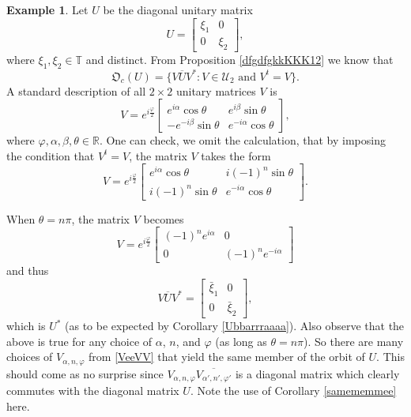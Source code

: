 \documentclass{dis}
\theoremstyle{plain}
\theoremstyle{definition}
\newtheorem{Example}[equation]{Example}
\def\R{\mathbb{R}}
\def\T{\mathbb{T}}
\newcommand{\0}{{\color{lightgray}0}}
\begin{document}
\begin{Example}\label{twobytwo}
 Let $U$ be  the diagonal unitary matrix 
$$U = \begin{bmatrix} \xi_1 & 0\\ 0 & \xi_2 \end{bmatrix},$$
where $\xi_1, \xi_2 \in \T$ and distinct.  From Proposition \ref{dfgdfgkkKKK12} we know that
$$\mathfrak{O}_c(U) = \{V \overline{U} V^{*}: \mbox{$V \in \mathscr{U}_2$ and $V^{t} = V$}\}.$$ A standard description of all $2 \times 2$ unitary matrices $V$  is
$$V = e^{i \frac{\varphi}{2}}\begin{bmatrix} e^{i \alpha} \cos \theta & e^{i \beta} \sin \theta\\
- e^{-i\beta} \sin \theta & e^{-i \alpha} \cos \theta\end{bmatrix},$$
where $\varphi, \alpha, \beta, \theta \in \R$. One can check, we omit the calculation, that by imposing the condition that $V^{t} = V$, the matrix $V$ takes the form
\begin{equation}\label{VVVVVmatrix}
V = e^{i \frac{\varphi}{2}}\begin{bmatrix} e^{i \alpha} \cos \theta & i (-1)^n \sin \theta\\
i (-1)^n \sin \theta & e^{-i \alpha} \cos \theta\end{bmatrix}.
\end{equation}


When $\theta = n \pi$, the matrix  $V$ becomes
\begin{equation}\label{VeeVV}
V = e^{i \frac{\varphi}{2}}\begin{bmatrix} (-1)^n e^{i \alpha} & 0\\
0 & (-1)^n e^{-i \alpha} \end{bmatrix}
\end{equation} and thus
\begin{equation}\label{9isudjhfjhhhY11}
V \overline{U} V^{*} = \begin{bmatrix} \bar \xi_1 & 0\\ 0 & \bar \xi_2 \end{bmatrix},
\end{equation}
which is $U^{*}$ (as to be expected by Corollary \ref{Ubbarrraaaa}). 
Also observe that the above is true for any choice of $\alpha$, $n$, and $\varphi$ (as long as $\theta = n \pi$). So there are many choices of $V_{\alpha, n, \varphi}$ from \eqref{VeeVV} that yield the same member of the orbit of $U$. This should come as no surprise since $V_{\alpha, n, \varphi} \overline{V_{\alpha', n', \varphi'}}$ is a diagonal matrix which clearly commutes with the diagonal matrix $U$. Note the use of Corollary \ref{samememmee} here. 



\end{Example}
\end{document}
